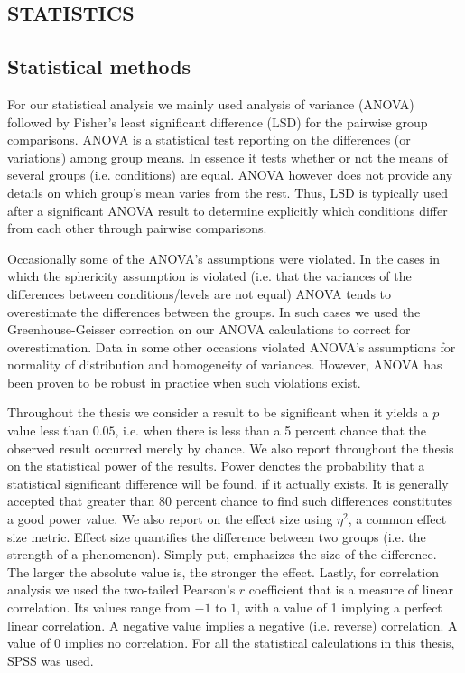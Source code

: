 \documentclass[a4paper,12pt,oneside,openright]{bhamthesis}
\begin{document}
\begin{appendices}
	
\chapter{STATISTICS}

\section{Statistical methods}

For our statistical analysis we mainly used analysis of variance (ANOVA) followed by Fisher's least significant difference (LSD) for the pairwise group comparisons. ANOVA is a statistical test reporting on the differences (or variations) among group means. In essence it tests whether or not the means of several groups (i.e. conditions) are equal. ANOVA however does not provide any details on which group's mean varies from the rest. Thus, LSD is typically used after a significant ANOVA result to determine explicitly which conditions differ from each other through pairwise comparisons.

Occasionally some of the ANOVA's assumptions were violated. In the cases in which the sphericity assumption is violated (i.e. that the variances of the differences between conditions/levels are not equal) ANOVA tends to overestimate the differences between the groups. In such cases we used the Greenhouse-Geisser correction on our ANOVA calculations to correct for overestimation. Data in some other occasions violated ANOVA's assumptions for normality of distribution and homogeneity of variances. However, ANOVA has been proven to be robust in practice when such violations exist. 
 
Throughout the thesis we consider a result to be significant when it yields a $p$ value less than $0.05$, i.e. when there is less than a 5 percent chance that the observed result occurred merely by chance. We also report throughout the thesis on the statistical power of the results. Power denotes the probability that a statistical significant difference will be found, if it actually exists. It is generally accepted that greater than 80 percent chance to find such differences constitutes a good power value. We also report on the effect size using $\eta^2$, a common effect size metric. Effect size quantifies the difference between two groups (i.e. the strength of a phenomenon). Simply put, emphasizes the size of the difference. The larger the absolute value is, the stronger the effect. Lastly, for correlation analysis we used the two-tailed Pearson's $r$ coefficient that is a measure of linear correlation. Its values range from $-1$ to $1$, with a value of 1 implying a perfect linear correlation. A negative value implies a negative (i.e. reverse) correlation. A value of 0 implies no correlation. For all the statistical calculations in this thesis, SPSS was used.



\end{appendices}
\end{document}
